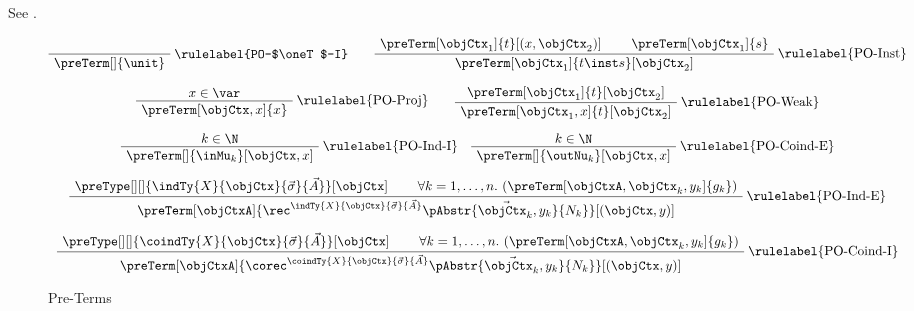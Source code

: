\documentclass[preprint]{sigplanconf}
\begin{document}
\begin{definition}
  See .
  \begin{figure*}
  \begin{gather*}
    \AxiomC{}
    \RightLabel{\rulelabel{PO-$\oneT$-I}}
    \UnaryInfC{$\preTerm[]{\unit}$}
    \bottomAlignProof
    \DisplayProof
    \qquad
    \AxiomC{$\preTerm[\objCtx_1]{t}[(x, \objCtx_2)]$}
    \AxiomC{$\preTerm[\objCtx_1]{s}$}
    \RightLabel{\rulelabel{PO-Inst}}
    \BinaryInfC{$\preTerm[\objCtx_1]{t \inst s}[\objCtx_2]$}
    \bottomAlignProof
    \DisplayProof
    \\[7pt]
    \AxiomC{$x \in \var$}
    \RightLabel{\rulelabel{PO-Proj}}
    \UnaryInfC{$\preTerm[\objCtx, x]{x}$}
    \DisplayProof
    \qquad
    \AxiomC{$\preTerm[\objCtx_1]{t}[\objCtx_2]$}
    \RightLabel{\rulelabel{PO-Weak}}
    \UnaryInfC{$\preTerm[\objCtx_1, x]{t}[\objCtx_2]$}
    \DisplayProof
    \\[7pt]
    \AxiomC{$k \in \N$}
    \RightLabel{\rulelabel{PO-Ind-I}}
    \UnaryInfC{$\preTerm[]{\inMu_k}[\objCtx, x]$}
    \DisplayProof
    \quad
    \AxiomC{$k \in \N$}
    \RightLabel{\rulelabel{PO-Coind-E}}
    \UnaryInfC{$\preTerm[]{\outNu_k}[\objCtx, x]$}
    \DisplayProof
    \\[7pt]
\AxiomC{$\preType[][]{\indTy{X}{\objCtx}{\vec{\sigma}}{\vec{A}}}[\objCtx]$}
    \AxiomC{$\forall k = 1, \dotsc, n. \, \left( \preTerm[\objCtxA, \objCtx_k, y_k]{g_k} \right)$}
    \RightLabel{\rulelabel{PO-Ind-E}}
    \BinaryInfC{$
      \preTerm[\objCtxA]{
        \rec^{\indTy{X}{\objCtx}{\vec{\sigma}}{\vec{A}}} \vec{\pAbstr{\objCtx_k, y_k}{N_k}}}
      [(\objCtx, y)]$}
    \DisplayProof
    \\[7pt]
    \AxiomC{$\preType[][]{\coindTy{X}{\objCtx}{\vec{\sigma}}{\vec{A}}}[\objCtx]$}
    \AxiomC{$\forall k = 1, \dotsc, n. \, \left( \preTerm[\objCtxA, \objCtx_k, y_k]{g_k} \right)$}
    \RightLabel{\rulelabel{PO-Coind-I}}
    \BinaryInfC{$
      \preTerm[\objCtxA]{
        \corec^{\coindTy{X}{\objCtx}{\vec{\sigma}}{\vec{A}}} \vec{\pAbstr{\objCtx_k, y_k}{N_k}}}
      [(\objCtx, y)]$}
    \DisplayProof
  \end{gather*}
    \caption{Pre-Terms}
    \label{fig:pre-terms}
  \end{figure*}
\end{definition}
\end{document}
